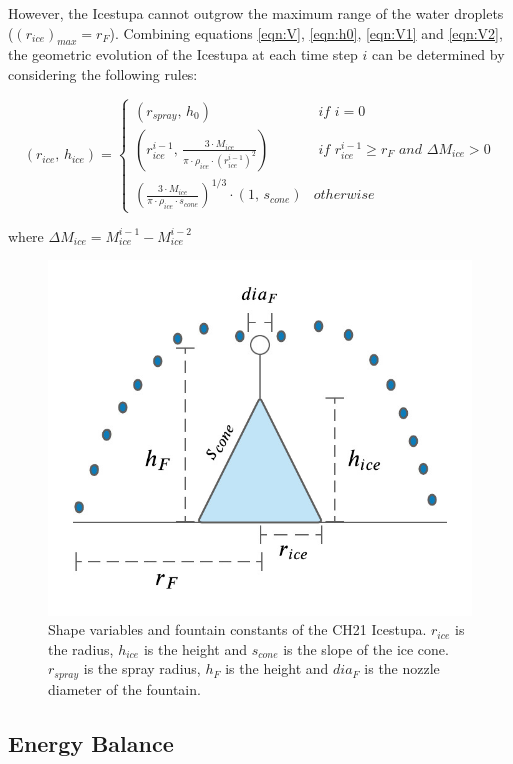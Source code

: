 \documentclass[utf8]{frontiersSCNS} %
\begin{document}
However, the Icestupa cannot outgrow the maximum range of the water droplets ($(r_{ice})_{max} = r_{F}$). Combining
equations \ref{eqn:V}, \ref{eqn:h0}, \ref{eqn:V1} and \ref{eqn:V2}, the geometric evolution of the Icestupa at each time step $i$ can
be determined by considering the following rules:

\begin{equation} (r_{ice},\, h_{ice}) = \left\{ \begin{array}{ll} (r_{spray} ,\, h_0) & \textit{ if } i=0\\
    (r_{ice}^{i-1},\, \frac{3 \cdot M_{ice}}{\pi \cdot \rho_{ice} \cdot {(r_{ice}^{i-1})}^2}) & \textit{ if }
    r_{ice}^{i-1} \geq r_{F} \textit{ and } \Delta M_{ice} > 0 \\ (\frac{3 \cdot M_{ice}}{\pi \cdot \rho_{ice} \cdot s_{cone}})^{1/3} \cdot (1,\,  s_{cone}) &
otherwise \end{array} \right.  \label{eqn:A2} \end{equation}

where $\Delta M_{ice} = M_{ice}^{i-1} - M_{ice}^{i-2}$

    \begin{figure} \begin{center} \includegraphics[width=10
cm]{Figures/Figure_5.jpg} \end{center} \caption{Shape variables and fountain constants of the CH21 Icestupa. $r_{ice}$ is
the radius, $h_{ice}$ is the height and $s_{cone}$ is the slope of the ice cone. $r_{spray}$ is the spray radius, $h_F$ is the
height and $dia_F$ is the nozzle diameter of the fountain.} \label{fig:shape} \end{figure}

\subsection{Energy Balance} \label{section:EB}
\end{document}
